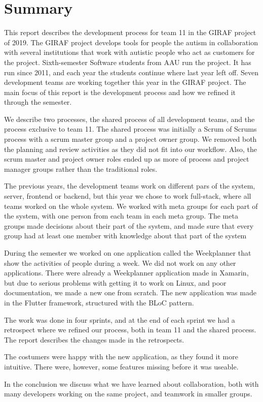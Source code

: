 \section{Summary}

This report describes the development process for team 11 in the GIRAF project of 2019. The GIRAF project develops tools for people the autism in collaboration with several institutions that work with autistic people who act as customers for the project. Sixth-semester Software students from AAU run the project. It has run since 2011, and each year the students continue where last year left off. Seven development teams are working together this year in the GIRAF project. The main focus of this report is the development process and how we refined it through the semester.

We describe two processes, the shared process of all development teams, and the process exclusive to team 11. The shared process was initially a Scrum of Scrums process with a scrum master group and a project owner group. We removed both the planning and review activities as they did not fit into our workflow. Also, the scrum master and project owner roles ended up as more of process and project manager groups rather than the traditional roles. 

The previous years, the development teams work on different pars of the system, server, frontend or backend, but this year we chose to work full-stack, where all teams worked on the whole system. We worked with meta groups for each part of the system, with one person from each team in each meta group. The meta groups made decisions about their part of the system, and made sure that every group had at least one member with knowledge about that part of the system 

During the semester we worked on one application called the Weekplanner that show the activities of people during a week. We did not work on any other applications. There were already a Weekplanner application made in Xamarin, but due to serious problems with getting it to work on Linux, and poor documentation, we made a new one from scratch. The new application was made in the Flutter framework, structured with the BLoC pattern. 

The work was done in four sprints, and at the end of each sprint we had a retrospect where we refined our process, both in team 11 and the shared process. The report describes the changes made in the retrospects.

The costumers were happy with the new application, as they found it more intuitive. There were, however, some features missing before it was useable. 

In the conclusion we discuss what we have learned about collaboration, both with many developers working on the same project, and teamwork in smaller groups. 
